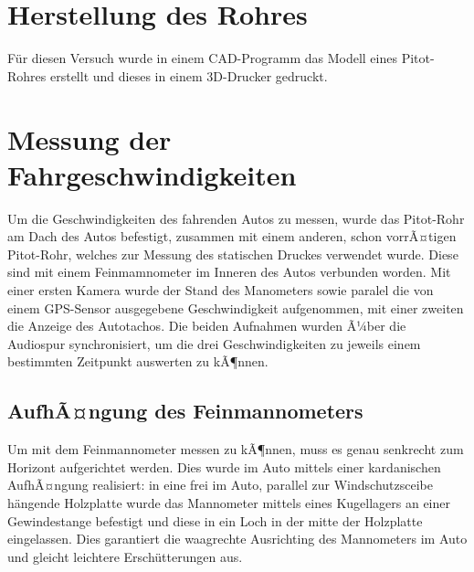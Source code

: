 \section{Herstellung des Rohres}
Für diesen Versuch wurde in einem CAD-Programm das Modell eines Pitot-Rohres erstellt und dieses in einem 3D-Drucker gedruckt.

\section{Messung der Fahrgeschwindigkeiten}
Um die Geschwindigkeiten des fahrenden Autos zu messen, wurde das Pitot-Rohr am Dach des Autos befestigt, zusammen mit einem anderen, schon vorrÃ¤tigen Pitot-Rohr, welches zur Messung des statischen Druckes verwendet wurde. Diese sind mit einem Feinmamnometer im Inneren des Autos verbunden worden. Mit einer ersten Kamera wurde der Stand des Manometers sowie paralel die von einem GPS-Sensor ausgegebene Geschwindigkeit aufgenommen, mit einer zweiten die Anzeige des Autotachos. Die beiden Aufnahmen wurden Ã¼ber die Audiospur synchronisiert, um die drei Geschwindigkeiten zu jeweils einem bestimmten Zeitpunkt auswerten zu kÃ¶nnen.

\subsection{AufhÃ¤ngung des Feinmannometers}
Um mit dem Feinmannometer messen zu kÃ¶nnen, muss es genau senkrecht zum Horizont aufgerichtet werden. Dies wurde im Auto mittels einer kardanischen AufhÃ¤ngung realisiert: in eine frei im Auto, parallel zur Windschutzsceibe hängende Holzplatte wurde das Mannometer mittels eines Kugellagers an einer Gewindestange befestigt und diese in ein Loch in der mitte der Holzplatte eingelassen. Dies garantiert die waagrechte Ausrichting des Mannometers im Auto und gleicht leichtere Erschütterungen aus. 